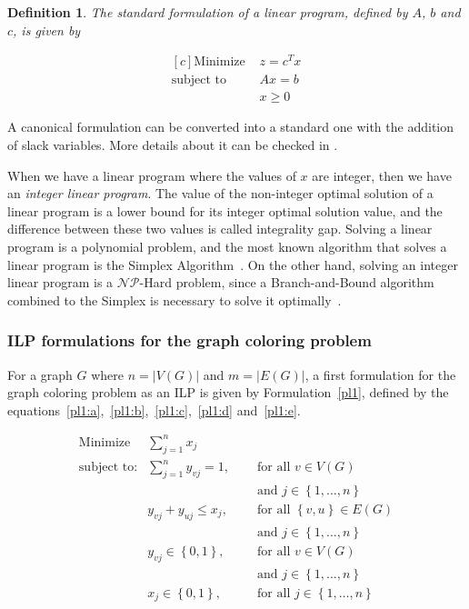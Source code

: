 \documentclass[fleqn,10pt]{SelfArx} %
\newtheorem{defin}{Definition}
\newcommand{\NP}{\ensuremath{\mathcal{N}\mathcal{P}}}
\newcommand{\chaves}[1] {\ensuremath{{\left \{ {#1} \right \}}}}
\begin{document}
	\begin{defin} The standard formulation of a linear program, defined by
		$A$, $b$ and $c$, is given by
		
		\begin{equation*}
		\begin{aligned}[c] \text{Minimize } & z = c^{T}x\\ \text{subject to }&
		Ax = b\\ & x \geq 0
		\end{aligned}
		\end{equation*}\label{def:1b}
	\end{defin}
	
	A canonical formulation can be converted into a standard one with the
	addition of slack variables. More details about it can be checked in \cite{MatousekGaertner07}.
	
	When we have a linear program where the values of $x$ are integer,
	then we have an \emph{integer linear program}. The value of the
	non-integer optimal solution of a linear program is a lower bound for
	its integer optimal solution value, and the difference between these
	two values is called integrality gap. Solving a linear program is a
	polynomial problem, and the most known algorithm that solves a linear
	program is the Simplex Algorithm~\cite{Dantzig1963}. On the other hand,
	solving an integer linear program is a $\NP$-Hard problem,
	since a Branch-and-Bound algorithm combined to the Simplex is
	necessary to solve it optimally~\cite{PapadimitriouSteiglitz98}.
	
	
	\subsubsection{ILP formulations for the graph coloring problem}
	
	For a graph $G$ where $n = |V(G)|$ and $m = |E(G)|$, a first formulation for the graph
	coloring problem as an ILP is given by Formulation~\eqref{pl1}, defined by the equations~\eqref{pl1:a},~\eqref{pl1:b},~\eqref{pl1:c},~\eqref{pl1:d} and~\eqref{pl1:e}.
	
	\begin{subequations}\label{pl1}
		\begin{align}
		\text{Minimize}  & \displaystyle\sum\limits_{j=1}^{n} x_{j} & \label{pl1:a}\ \\
		\text{subject to:}& \displaystyle\sum\limits_{j=1}^{n} y_{vj} = 1,  &&\text{ for all } v \in V(G) \nonumber \\
		&&&\text{ and } j \in \chaves{1, \ldots,n}\label{pl1:b}\ \\
		&y_{vj} + y_{uj} \leq x_j, &&\text{ for all } \chaves{v,u} \in E(G) \nonumber\\      
		&&&\text{ and } j \in \chaves{1, \ldots,n}\label{pl1:c}\ \\
		&y_{vj} \in \chaves{0,1}, &&\text{ for all } v \in V(G)\nonumber\\
		&&&\text{ and } j \in \chaves{1, \ldots,n}\label{pl1:d}\ \\
		&x_{j} \in \chaves{0,1}, &&\text{ for all } j \in \chaves{1, \ldots,n}\label{pl1:e}\
		\end{align}
	\end{subequations}
	
\end{document}
